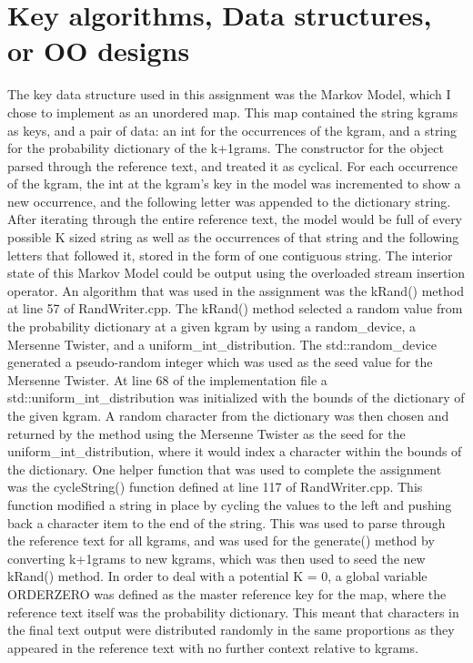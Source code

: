 \documentclass[12pt]{article}
\begin{document}
\section[2]{Key algorithms, Data structures, or OO designs}
\hfill\begin{minipage}{\dimexpr\textwidth-1cm}
The key data structure used in this assignment was the Markov Model, which I chose to implement as an unordered map. This map contained the string kgrams as keys, and a pair of data: an int for the occurrences of the kgram, and a string for the probability dictionary of the k+1grams. The constructor for the object parsed through the reference text, and treated it as cyclical. For each occurrence of the kgram, the int at the kgram’s key in the model was incremented to show a new occurrence, and the following letter was appended to the dictionary string. After iterating through the entire reference text, the model would be full of every possible K sized string as well as the occurrences of that string and the following letters that followed it, stored in the form of one contiguous string. The interior state of this Markov Model could be output using the overloaded stream insertion operator. \newline
\newline
An algorithm that was used in the assignment was the kRand() method at line 57 of RandWriter.cpp. The kRand() method selected a random value from the probability dictionary at a given kgram by using a random\_device, a Mersenne Twister, and a uniform\_int\_distribution. The std::random\_device generated a pseudo-random integer which was used as the seed value for the Mersenne Twister. At line 68 of the implementation file a std::uniform\_int\_distribution was initialized with the bounds of the dictionary of the given kgram. A random character from the dictionary was then chosen and returned by the method using the Mersenne Twister as the seed for the uniform\_int\_distribution, where it would index a character within the bounds of the dictionary. \newline
\newline
One helper function that was used to complete the assignment was the cycleString() function defined at line 117 of RandWriter.cpp. This function modified a string in place by cycling the values to the left and pushing back a character item to the end of the string. This was used to parse through the reference text for all kgrams, and was used for the generate() method by converting k+1grams to new kgrams, which was then used to seed the new kRand() method. \newline
\newline
In order to deal with a potential K = 0, a global variable ORDERZERO was defined as the master reference key for the map, where the reference text itself was the probability dictionary. This meant that characters in the final text output were distributed randomly in the same proportions as they appeared in the reference text with no further context relative to kgrams.
\end{minipage}
\end{document}
